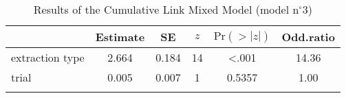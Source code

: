 \begin{table}
\begin{tabular}{l S[table-format=1.3] S[table-format=1.3] S[table-format=2] S[table-format=<1.4] S[table-format=2.2]}
  \lsptoprule
                  & {Estimate} & {SE} & {$z$} & {$\text{Pr}(>|z|)$} & {Odd.ratio} \\ 
  \midrule
  extraction type & 2.664 & 0.184 & 14 & <.001  & 14.36 \\ 
  trial           & 0.005 & 0.007 &  1 & 0.5357 &  1.00 \\ 
 \lspbottomrule
\end{tabular}
\caption{Results of the Cumulative Link Mixed Model (model n$^{\circ}$3)}
\label{tab:exp01b-m3}
\end{table}
